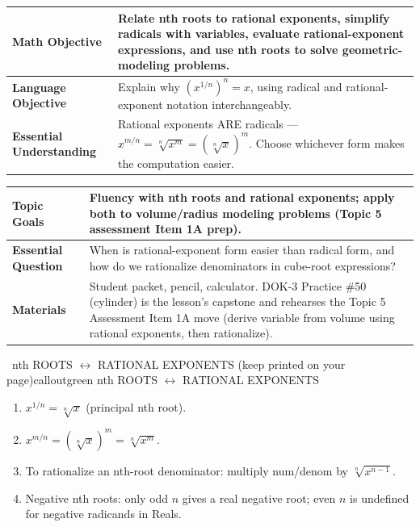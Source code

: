 \documentclass[11pt]{article}
\newcommand{\lessonrow}[2]{\textbf{#1} & #2 \\ \hline}
\begin{document}

{\small
\renewcommand{\arraystretch}{1.25}
\noindent\begin{tabular}{|p{1.8in}|p{4.8in}|}
\hline
\lessonrow{Math Objective}{Relate nth roots to rational exponents, simplify radicals with variables, evaluate rational-exponent expressions, and use nth roots to solve geometric-modeling problems.}
\lessonrow{Language Objective}{Explain why \((x^{1/n})^n = x\), using radical and rational-exponent notation interchangeably.}
\lessonrow{Essential Understanding}{Rational exponents ARE radicals --- \(x^{m/n} = \sqrt[n]{x^m} = (\sqrt[n]{x})^m\). Choose whichever form makes the computation easier.}
\end{tabular}
}

{\small
\renewcommand{\arraystretch}{1.25}
\noindent\begin{tabular}{|p{1.8in}|p{4.8in}|}
\hline
\lessonrow{Topic Goals}{Fluency with nth roots and rational exponents; apply both to volume/radius modeling problems (Topic 5 assessment Item 1A prep).}
\lessonrow{Essential Question}{When is rational-exponent form easier than radical form, and how do we rationalize denominators in cube-root expressions?}
\lessonrow{Materials}{Student packet, pencil, calculator. DOK-3 Practice \#50 (cylinder) is the lesson's capstone and rehearses the Topic 5 Assessment Item 1A move (derive variable from volume using rational exponents, then rationalize).}
\end{tabular}
}


\begin{callout}{\IconBook\ nth ROOTS \(\leftrightarrow\) RATIONAL EXPONENTS (keep printed on your page)}{calloutgreen}
nth ROOTS \(\leftrightarrow\) RATIONAL EXPONENTS
\begin{enumerate}[leftmargin=1.8em,itemsep=1pt,topsep=3pt]
  \item \(x^{1/n} = \sqrt[n]{x}\) (principal nth root).
  \item \(x^{m/n} = (\sqrt[n]{x})^m = \sqrt[n]{x^m}\).
  \item To rationalize an nth-root denominator: multiply num/denom by \(\sqrt[n]{x^{n-1}}\).
  \item Negative nth roots: only odd \(n\) gives a real negative root; even \(n\) is undefined for negative radicands in Reals.
\end{enumerate}
\end{callout}
\end{document}
